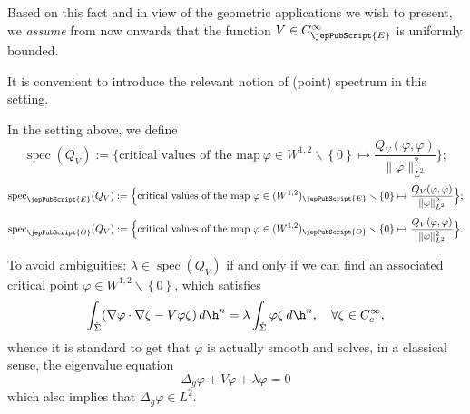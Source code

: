         	
        	
        	Based on this fact and in view of the geometric applications we wish to present, we \emph{assume} from now onwards that the function	$V\in C^{\infty}_{{\jepPubScript{E}}}$ is uniformly bounded. 
        
        	
        	It is convenient to introduce the relevant notion of (point) spectrum in this setting.
        	
        	\begin{definition}\label{def:spec} In the setting above, we define
        		\[
        		\operatorname{spec} (Q_V):=\Big\{\text{critical values of the map} \ \varphi\in W^{1,2}\smallsetminus \left\{0\right\} \mapsto \frac{Q_V(\varphi,\varphi)}{\|\varphi\|^2_{L^2}}\Big\};
        		\]
        		\[
        		\operatorname{spec}_{{\jepPubScript{E}}} (Q_V):=\Big\{\text{critical values of the map} \ \varphi\in (W^{1,2})_{{\jepPubScript{E}}}\smallsetminus \left\{0\right\} \mapsto \frac{Q_V(\varphi,\varphi)}{\|\varphi\|^2_{L^2}}\Big\};
        		\]
        		\[
        		\operatorname{spec}_{{\jepPubScript{O}}} (Q_V):=\Big\{\text{critical values of the map} \ \varphi\in (W^{1,2})_{{\jepPubScript{O}}}\smallsetminus \left\{0\right\} \mapsto \frac{Q_V(\varphi,\varphi)}{\|\varphi\|^2_{L^2}}\Big\}.
        		\]
        	\end{definition}
        To avoid ambiguities: $\lambda\in \operatorname{spec}(Q_V)$ if and only if we can find an associated critical point $\varphi \in W^{1,2}\smallsetminus\left\{0\right\}$, which satisfies
        	\begin{equation}\label{eq:weak}
        	\int_{\check{\Sigma}}(\nabla \varphi \cdot \nabla\zeta -V\varphi\zeta)\,d\h^n = \lambda \int_{\check{\Sigma}}\varphi\zeta\,d\h^n, \ \ \ \forall \zeta\in C^{\infty}_c,
        	\end{equation}
        	whence it is standard to get that $\varphi$ is actually smooth and solves, in a classical sense, the eigenvalue equation
        	\[
        	\Delta_g \varphi+V\varphi+\lambda\varphi=0
        	\]
        	which also implies that $\Delta_g\varphi \in L^2$. 
        	
